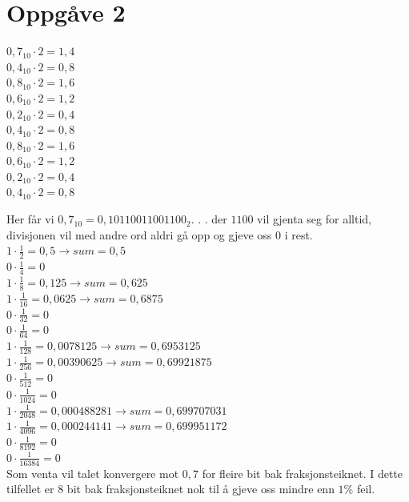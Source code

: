 \documentclass[12pt,a4paper]{article}
\begin{document}
	\section{Oppgåve 2}
		\begin{centering}
		$0,7_{10} \cdot 2 = 1,4$ \\
		$0,4_{10} \cdot 2 = 0,8$ \\
		$0,8_{10} \cdot 2 = 1,6$ \\
		$0,6_{10} \cdot 2 = 1,2$ \\
		$0,2_{10} \cdot 2 = 0,4$ \\
		$0,4_{10} \cdot 2 = 0,8$ \\
		$0,8_{10} \cdot 2 = 1,6$ \\
		$0,6_{10} \cdot 2 = 1,2$ \\
		$0,2_{10} \cdot 2 = 0,4$ \\
		$0,4_{10} \cdot 2 = 0,8$ \\
		\end{centering}

		Her får vi $0,7_{10}=0,10110011001100_{2}$. . . der $1100$ vil gjenta
		seg for alltid, divisjonen vil med andre ord aldri gå opp og gjeve
		oss 0 i rest. \\

		$1 \cdot \frac{1}{2} = 0,5 \rightarrow sum = 0,5$ \\
		$0 \cdot \frac{1}{4} = 0$ \\
		$1 \cdot \frac{1}{8} = 0,125 \rightarrow sum = 0,625$ \\
		$1 \cdot \frac{1}{16} = 0,0625 \rightarrow sum = 0,6875$ \\
		$0 \cdot \frac{1}{32} = 0$ \\
		$0 \cdot \frac{1}{64} = 0$ \\
		$1 \cdot \frac{1}{128} = 0,0078125 \rightarrow sum = 0,6953125$ \\
		$1 \cdot \frac{1}{256} = 0,00390625 \rightarrow sum = 0,69921875$ \\
		$0 \cdot \frac{1}{512} = 0$ \\
		$0 \cdot \frac{1}{1024} = 0$ \\
		$1 \cdot \frac{1}{2048} = 0,000488281 \rightarrow sum = 0,699707031$ \\
		$1 \cdot \frac{1}{4096} = 0,000244141 \rightarrow sum = 0,699951172$ \\
		$0 \cdot \frac{1}{8192} = 0$ \\
		$0 \cdot \frac{1}{16384} = 0$ \\

		Som venta vil talet konvergere mot $0,7$ for fleire bit bak fraksjonsteiknet.
		I dette tilfellet er 8 bit bak fraksjonsteiknet nok til å gjeve oss mindre
		enn $1\%$ feil.
		
\end{document}
